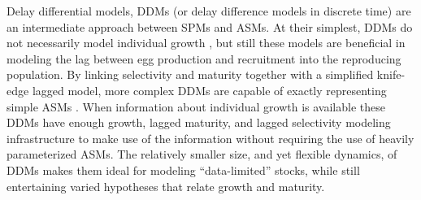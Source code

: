 %
Delay differential models, DDMs (or delay difference models in discrete time) 
are an intermediate approach between SPMs and ASMs. At their simplest, DDMs do 
not necessarily model individual growth \cite{dick_depletion-based_2011, aalto_separating_2015}, 
but still these models are beneficial in modeling the lag between egg production 
and recruitment into the reproducing population.  %
By linking selectivity and maturity together with a simplified knife-edge lagged 
model, more complex DDMs are capable of exactly representing simple ASMs \cite{deriso_harvesting_1980, fournier_length-based_1987, schnute_general_1985, schnute_general_1987}. 
%
When information about individual growth is available these DDMs have enough 
growth, lagged maturity, and lagged selectivity modeling infrastructure to make 
use of the information without requiring the use of heavily parameterized ASMs. %
The relatively smaller size, and yet flexible dynamics, of DDMs makes them ideal for 
modeling ``data-limited'' stocks, while still entertaining varied hypotheses that 
relate growth and maturity.  



